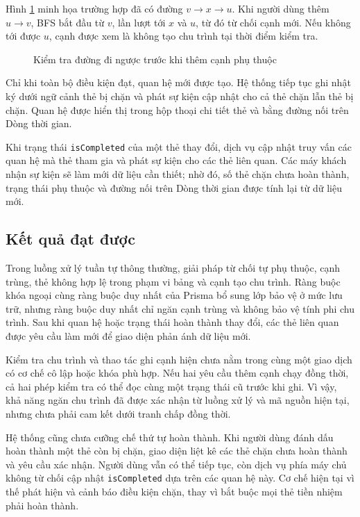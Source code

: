 \documentclass[../DoAn.tex]{subfiles}
\begin{document}
Hình \ref{fig:chapter5_dependency_cycle_check} minh họa trường hợp đã có đường \(v \rightarrow x \rightarrow u\). Khi người dùng thêm \(u \rightarrow v\), BFS bắt đầu từ \(v\), lần lượt tới \(x\) và \(u\), từ đó từ chối cạnh mới. Nếu không tới được \(u\), cạnh được xem là không tạo chu trình tại thời điểm kiểm tra.

\begin{figure}[H]
    \centering
    \caption{Kiểm tra đường đi ngược trước khi thêm cạnh phụ thuộc}
    \label{fig:chapter5_dependency_cycle_check}
\end{figure}

Chỉ khi toàn bộ điều kiện đạt, quan hệ mới được tạo. Hệ thống tiếp tục ghi nhật ký dưới ngữ cảnh thẻ bị chặn và phát sự kiện cập nhật cho cả thẻ chặn lẫn thẻ bị chặn. Quan hệ được hiển thị trong hộp thoại chi tiết thẻ và bằng đường nối trên Dòng thời gian.

Khi trạng thái \texttt{isCompleted} của một thẻ thay đổi, dịch vụ cập nhật truy vấn các quan hệ mà thẻ tham gia và phát sự kiện cho các thẻ liên quan. Các máy khách nhận sự kiện sẽ làm mới dữ liệu cần thiết; nhờ đó, số thẻ chặn chưa hoàn thành, trạng thái phụ thuộc và đường nối trên Dòng thời gian được tính lại từ dữ liệu mới.

\subsection{Kết quả đạt được}
\label{subsection:5.2.3}

Trong luồng xử lý tuần tự thông thường, giải pháp từ chối tự phụ thuộc, cạnh trùng, thẻ không hợp lệ trong phạm vi bảng và cạnh tạo chu trình. Ràng buộc khóa ngoại cùng ràng buộc duy nhất của Prisma bổ sung lớp bảo vệ ở mức lưu trữ, nhưng ràng buộc duy nhất chỉ ngăn cạnh trùng và không bảo vệ tính phi chu trình. Sau khi quan hệ hoặc trạng thái hoàn thành thay đổi, các thẻ liên quan được yêu cầu làm mới để giao diện phản ánh dữ liệu mới.

Kiểm tra chu trình và thao tác ghi cạnh hiện chưa nằm trong cùng một giao dịch có cơ chế cô lập hoặc khóa phù hợp. Nếu hai yêu cầu thêm cạnh chạy đồng thời, cả hai phép kiểm tra có thể đọc cùng một trạng thái cũ trước khi ghi. Vì vậy, khả năng ngăn chu trình đã được xác nhận từ luồng xử lý và mã nguồn hiện tại, nhưng chưa phải cam kết dưới tranh chấp đồng thời.

Hệ thống cũng chưa cưỡng chế thứ tự hoàn thành. Khi người dùng đánh dấu hoàn thành một thẻ còn bị chặn, giao diện liệt kê các thẻ chặn chưa hoàn thành và yêu cầu xác nhận. Người dùng vẫn có thể tiếp tục, còn dịch vụ phía máy chủ không từ chối cập nhật \texttt{isCompleted} dựa trên các quan hệ này. Cơ chế hiện tại vì thế phát hiện và cảnh báo điều kiện chặn, thay vì bắt buộc mọi thẻ tiền nhiệm phải hoàn thành.
\end{document}
